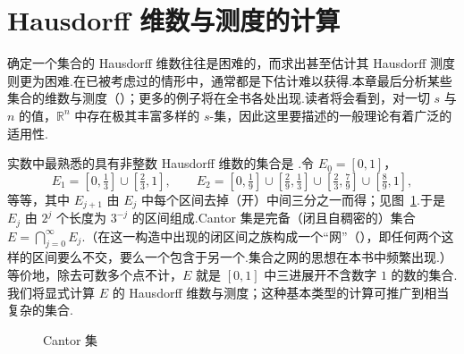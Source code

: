 \section{Hausdorff 维数与测度的计算}

确定一个集合的 Hausdorff 维数往往是困难的，而求出甚至估计其 Hausdorff 测度则更为困难.在已被考虑过的情形中，通常都是下估计难以获得.本章最后分析某些集合的维数与测度（）；更多的例子将在全书各处出现.读者将会看到，对一切 $s$ 与 $n$ 的值，$\mathbb{R}^n$ 中存在极其丰富多样的 $s$-集，因此这里要描述的一般理论有着广泛的适用性.

实数中最熟悉的具有非整数 Hausdorff 维数的集合是 .令 $E_0=[0,1]$，
\[
  E_1=[0,\tfrac{1}{3}]\cup[\tfrac{2}{3},1],\qquad
  E_2=[0,\tfrac{1}{9}]\cup[\tfrac{2}{9},\tfrac{1}{3}]\cup[\tfrac{2}{3},\tfrac{7}{9}]\cup[\tfrac{8}{9},1],
\]
等等，其中 $E_{j+1}$ 由 $E_j$ 中每个区间去掉（开）中间三分之一而得；见图~\ref{fig:1.1}.于是 $E_j$ 由 $2^j$ 个长度为 $3^{-j}$ 的区间组成.Cantor 集是完备（闭且自稠密的）集合 $E=\bigcap_{j=0}^{\infty}E_j$.（在这一构造中出现的闭区间之族构成一个``网''（），即任何两个这样的区间要么不交，要么一个包含于另一个.集合之网的思想在本书中频繁出现.）等价地，除去可数多个点不计，$E$ 就是 $[0,1]$ 中三进展开不含数字 $1$ 的数的集合.我们将显式计算 $E$ 的 Hausdorff 维数与测度；这种基本类型的计算可推广到相当复杂的集合.

\begin{figure}[htbp]
  \centering
  \caption{Cantor 集}
  \label{fig:1.1}
\end{figure}

